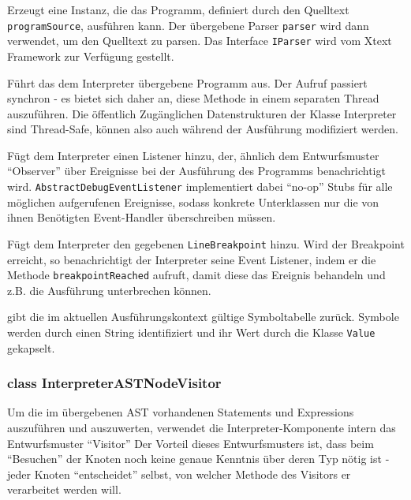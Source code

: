 \begin{description}
    Erzeugt eine Instanz, die das Programm, definiert durch den Quelltext \texttt{programSource}, ausführen kann. Der übergebene Parser \texttt{parser} wird dann verwendet, um den Quelltext zu parsen. Das Interface \texttt{IParser} wird vom Xtext Framework zur Verfügung gestellt.

    Führt das dem Interpreter übergebene Programm aus. Der Aufruf passiert synchron - es bietet sich daher an, diese Methode in einem separaten Thread auszuführen. Die öffentlich Zugänglichen Datenstrukturen der Klasse Interpreter sind Thread-Safe, können also auch während der Ausführung modifiziert werden.

    Fügt dem Interpreter einen Listener hinzu, der, ähnlich dem Entwurfsmuster ``Observer'' über Ereignisse bei der Ausführung des Programms benachrichtigt wird. \texttt{AbstractDebugEventListener} implementiert dabei ``no-op'' Stubs für alle möglichen aufgerufenen Ereignisse, sodass konkrete Unterklassen nur die von ihnen Benötigten Event-Handler überschreiben müssen.


    Fügt dem Interpreter den gegebenen \texttt{LineBreakpoint} hinzu. Wird der Breakpoint erreicht, so benachrichtigt der Interpreter seine Event Listener, indem er die Methode \texttt{breakpointReached} aufruft, damit diese das Ereignis behandeln und z.B. die Ausführung unterbrechen können.

     gibt die im aktuellen Ausführungskontext gültige Symboltabelle zurück. Symbole werden durch einen String identifiziert und ihr Wert durch die Klasse \texttt{Value} gekapselt.
\end{description}

\subsubsection{class InterpreterASTNodeVisitor}
Um die im übergebenen AST vorhandenen Statements und Expressions auszuführen und auszuwerten, verwendet die Interpreter-Komponente intern das Entwurfsmuster ``Visitor'' Der Vorteil dieses Entwurfsmusters ist, dass beim ``Besuchen'' der Knoten noch keine genaue Kenntnis über deren Typ nötig ist - jeder Knoten ``entscheidet'' selbst, von welcher Methode des Visitors er verarbeitet werden will.

